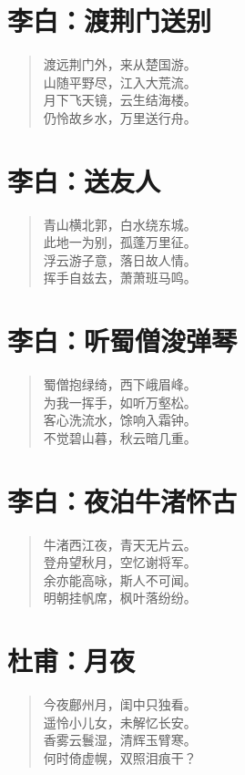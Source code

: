 \documentclass[12pt,oneside]{book}
\newenvironment{shici}{
\begin{verse}
\centering\large\hspace{12pt}}
{\end{verse}}
\begin{document}
\chapter{李白：渡荆门送别}
\begin{shici}
渡远荆门外，来从楚国游。\\
山随平野尽，江入大荒流。\\
月下飞天镜，云生结海楼。\\
仍怜故乡水，万里送行舟。
\end{shici}

\chapter{李白：送友人}
\begin{shici}
青山横北郭，白水绕东城。\\
此地一为别，孤蓬万里征。\\
浮云游子意，落日故人情。\\
挥手自兹去，萧萧班马鸣。
\end{shici}

\chapter{李白：听蜀僧浚弹琴}
\begin{shici}
蜀僧抱绿绮，西下峨眉峰。\\
为我一挥手，如听万壑松。\\
客心洗流水，馀响入霜钟。\\
不觉碧山暮，秋云暗几重。
\end{shici}

\chapter{李白：夜泊牛渚怀古}
\begin{shici}
牛渚西江夜，青天无片云。\\
登舟望秋月，空忆谢将军。\\
余亦能高咏，斯人不可闻。\\
明朝挂帆席，枫叶落纷纷。
\end{shici}

\chapter{杜甫：月夜}
\begin{shici}
今夜鄜州月，闺中只独看。\\
遥怜小儿女，未解忆长安。\\
香雾云鬟湿，清辉玉臂寒。\\
何时倚虚幌，双照泪痕干？
\end{shici}
\end{document}
